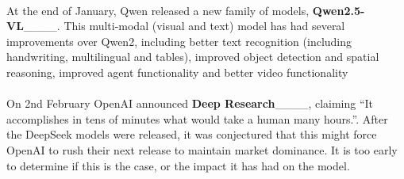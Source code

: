 \paragraph{}At the end of January, Qwen released a new family of models, \textbf{Qwen2.5-VL}____. This multi-modal (visual and text) model has had several improvements over Qwen2, including better text recognition (including handwriting, multilingual and tables), improved object detection and spatial reasoning, improved agent functionality and better video functionality

\paragraph{}On 2nd February OpenAI announced \textbf{Deep Research}____, claiming “It accomplishes in tens of minutes what would take a human many hours.”. After the DeepSeek models were released, it was conjectured that this might force OpenAI to rush their next release to maintain market dominance. It is too early to determine if this is the case, or the impact it has had on the model.
